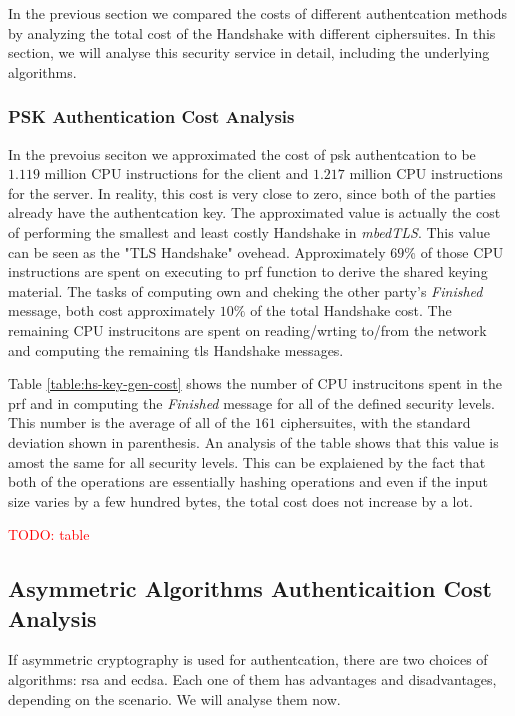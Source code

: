\documentclass{llncs}
\newcommand{\todo}[1]{\textcolor{red}{TODO: #1}\PackageWarning{TODO:}{#1!}}
\begin{document}
In the previous section we compared the costs of different authentcation methods by analyzing the total cost of the
Handshake with different ciphersuites. In this section, we will analyse this security service in detail, including the
underlying algorithms.

\subsubsection{PSK Authentication Cost Analysis}

In the prevoius seciton we approximated the cost of \gls{psk} authentcation to be $1.119$ million CPU instructions 
for the client and $1.217$ million CPU instructions for the server. In reality, this cost is very close to zero, since
both of the parties already have the authentcation key. The approximated value is actually the cost of performing the 
smallest and least costly Handshake in \textit{mbedTLS}.
This value can be seen as the "TLS Handshake" ovehead. Approximately $69\%$ of those CPU instructions are spent on
executing to \gls{prf} function to derive the shared keying material. The tasks of computing own and cheking the other
party's \textit{Finished} message, both cost approximately $10\%$ of the total Handshake cost. The remaining CPU
instrucitons are spent on reading/wrting to/from the network and computing the remaining \gls{tls} Handshake messages.

Table \ref{table:hs-key-gen-cost} shows the number of CPU instrucitons spent in the \gls{prf}
and in computing the \textit{Finished} message for all of the defined security levels. 
This number is the average of all of the $161$ ciphersuites, with the standard deviation shown in parenthesis.
An analysis of the table shows that this value is amost the same for all security levels. This can be explaiened by
the fact that both of the operations are essentially hashing operations and even if the input size varies
by a few hundred bytes, the total cost does not increase by a lot.

\todo{table}

\subsection{Asymmetric Algorithms Authenticaition Cost Analysis} \label{sec:asym-algs-analysis} 

If asymmetric cryptography is used for authentcation, there are two
choices of algorithms: \gls{rsa} and \gls{ecdsa}. Each one of them has advantages and disadvantages, depending on the
scenario. We will analyse them now.
\end{document}
